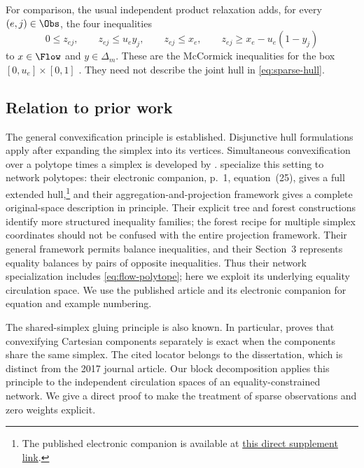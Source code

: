 For comparison, the usual independent product relaxation adds, for every
$(e,j)\in\Obs$, the four inequalities
\begin{equation}\label{eq:mccormick}
 0\le z_{ej},\qquad z_{ej}\le u_e y_j,\qquad
 z_{ej}\le x_e,\qquad
 z_{ej}\ge x_e-u_e(1-y_j)
\end{equation}
to $x\in\Flow$ and $y\in\Delta_m$. These are the McCormick inequalities
for the box $[0,u_e]\times[0,1]$ \citep{McCormick1976}. They need not describe
the joint hull in \eqref{eq:sparse-hull}.

\subsection{Relation to prior work}\label{subsec:prior-work}
The general convexification principle is established. Disjunctive hull
formulations \citep{Balas1998} apply after expanding the simplex into its
vertices. Simultaneous convexification over a polytope times a simplex is
developed by \citet{DavarniaRichardTawarmalani2017}.
\citet{KhademniaDavarnia2025} specialize this setting to network polytopes:
their electronic companion, p.~1, equation~(25), gives a full extended
hull,\footnote{The published electronic companion is available at
\href{https://pubsonline.informs.org/doi/suppl/10.1287/moor.2023.0001/suppl_file/moor.2023.0001.sm1.pdf}{this direct supplement link}.}
and their
aggregation-and-projection framework gives a complete original-space
description in principle. Their explicit tree and forest constructions
identify more structured inequality families; the forest recipe for multiple
simplex coordinates should not be confused with the entire projection
framework. Their general framework permits balance inequalities, and their
Section~3 represents equality balances by pairs of opposite inequalities.
Thus their network specialization includes \eqref{eq:flow-polytope}; here we
exploit its underlying equality circulation space. We use the published
article and its electronic companion for equation and example numbering.

The shared-simplex gluing principle is also known. In particular,
\citet[Proposition~2.6]{Davarnia2016} proves that convexifying Cartesian
components separately is exact when the components share the same simplex.
The cited locator belongs to the dissertation, which is distinct from the
2017 journal article. Our block decomposition applies this principle to the
independent circulation spaces of an equality-constrained network. We give a
direct proof to make the treatment of sparse observations and zero weights
explicit.

